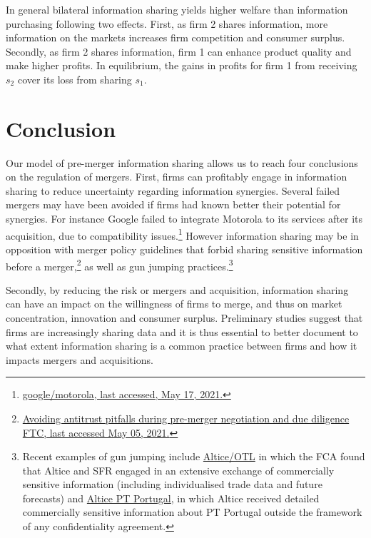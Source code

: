 \documentclass[a4paper,leqno]{article}%
\begin{document}
\medskip

In general bilateral information sharing yields higher welfare than information purchasing following two effects. First, as firm 2 shares information, more information on the markets increases firm competition and consumer surplus. Secondly, as firm 2 shares information, firm 1 can enhance product quality and make higher profits. In equilibrium, the gains in profits for firm 1 from receiving $s_2$ cover its loss from sharing $s_1$. 

\medskip

\section{Conclusion}\label{disc}

Our model of pre-merger information sharing allows us to reach four conclusions on the regulation of mergers. First, firms can profitably engage in information sharing to reduce uncertainty regarding information synergies. Several failed mergers may have been avoided if firms had known better their potential for synergies. For instance Google failed to integrate Motorola to its services after its acquisition, due to compatibility issues.\footnote{\href{https://salessynergy.net/the-biggest-acquisition-disasters-that-put-companies-into-quite-a-bit-of-trouble/}{google/motorola, last accessed, May 17, 2021.}} However information sharing may be in opposition with merger policy guidelines that forbid sharing sensitive information before a merger,\footnote{\href{https://www.ftc.gov/news-events/blogs/competition-matters/2018/03/avoiding-antitrust-pitfalls-during-pre-merger}{Avoiding antitrust pitfalls during pre-merger negotiation and due diligence FTC, last accessed May 05, 2021.}} as well as gun jumping practices.\footnote{Recent examples of gun jumping include \href{https://sites-herbertsmithfreehills.vuturevx.com/46/12874/compose-email/the-altice-case-a-costly-warning-not-to-engage-in-gun-jumping-before-receiving-merger-control-clearance.asp}{Altice/OTL} in which the FCA found that Altice and SFR engaged in an extensive exchange of commercially sensitive information (including individualised trade data and future forecasts) and \href{https://ec.europa.eu/commission/presscorner/detail/en/IP_18_3522}{Altice PT Portugal}, in which Altice received detailed commercially sensitive information about PT Portugal outside the framework of any confidentiality agreement.}


Secondly, by reducing the risk or mergers and acquisition, information sharing can have an impact on the willingness of firms to merge, and thus on market concentration, innovation and consumer surplus. Preliminary studies suggest that firms are increasingly sharing data \citep{scaria2018study} and it is thus essential to better document to what extent information sharing is a common practice between firms and how it impacts mergers and acquisitions.
\end{document}
